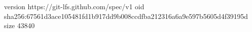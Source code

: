 version https://git-lfs.github.com/spec/v1
oid sha256:67561d3ace105481fd1b917dd9b008ccdfba212316a6a9e597b5605d4f39195d
size 43840
